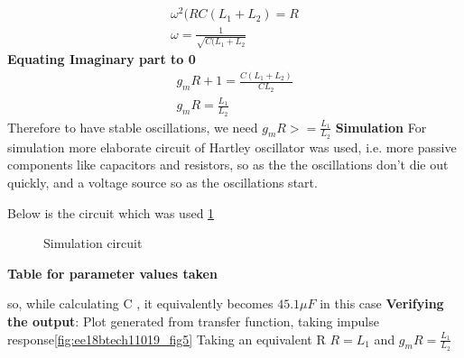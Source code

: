 \begin{enumerate}[label=\arabic*.,ref=\theenumi]
\begin{align}
    \omega^2(RC(L_1 +L_2) = R\\
    \omega = \frac{1}{\sqrt{C(L_1 + L_2}}
\end{align}
\textbf{Equating Imaginary part to 0}\newline
\begin{align}
    g_mR + 1 = \frac{C(L_1 +L_2)}{CL_2}\\
    g_mR = \frac{L_1}{L_2}
\end{align}
Therefore to have stable oscillations, we need \newline
$g_mR >= \frac{L_1}{L_2}$\newline\newline
\textbf{Simulation}\newline
For simulation more elaborate circuit of Hartley oscillator was used, i.e. more passive components like capacitors and resistors, so as the the oscillations don't die out quickly, and a voltage source so as the oscillations start.\newline

Below is the circuit which was used \ref{fig:ee18btech11019_fig4}
\begin{figure}[!ht]
	\begin{center}
		\resizebox{\columnwidth}{!}{}
	\end{center}
\caption{Simulation circuit}
\label{fig:ee18btech11019_fig4}
\end{figure}


\textbf{Table for parameter values taken}
\begin{table}[!ht]
\centering

\caption{}
\label{table:ee18btech11019_1}
\end{table}
so, while calculating C , it equivalently becomes $45.1\mu F$ in this case\newline
\textbf{Verifying the output}:\newline
Plot generated from transfer function, taking impulse response\newline \ref{fig:ee18btech11019_fig5}
Taking an equivalent R  \newline
$R = L_1$ and $g_mR = \frac{L_1}{L_2}$\newline


\end{enumerate}
